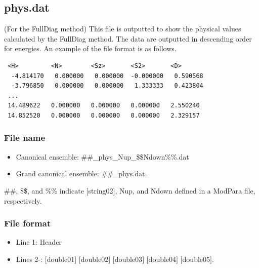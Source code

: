 \subsection{phys.dat}
\label{Subsec:phys}
(For the FullDiag method)  This file is outputted to show the physical values calculated by the FullDiag method.  The data are outputted in descending order for energies. An example of the file format is as follows.\\
\begin{minipage}{12.5cm}
\begin{screen}
\begin{verbatim}
 <H>         <N>        <Sz>       <S2>       <D> 
  -4.814170   0.000000   0.000000  -0.000000   0.590568
  -3.796850   0.000000   0.000000   1.333333   0.423804
 ...
 14.489622   0.000000   0.000000   0.000000   2.550240
 14.852520   0.000000   0.000000   0.000000   2.329157
\end{verbatim}
\end{screen}
\end{minipage}

\subsubsection{File name}
\begin{itemize}
   \item {Canonical ensemble:} \#\#\_phys\_Nup\_\$\$Ndown\%\%.dat
   \item {Grand canonical ensemble:} \#\#\_phys.dat.
 \end{itemize}
  \#\#, \$\$, and \%\% indicate [string02], Nup, and Ndown defined in a ModPara file, respectively.

\subsubsection{File format}
 \begin{itemize}
   \item Line 1: Header
   \item Lines 2-: $[$double01$]$ $[$double02$]$ $[$double03$]$ $[$double04$]$ $[$double05$]$.
  \end{itemize}
